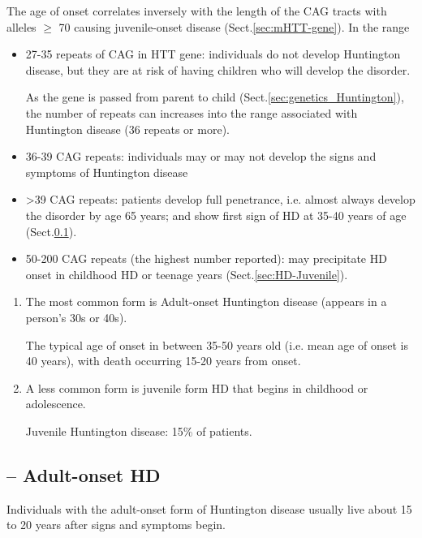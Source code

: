 The age of onset correlates inversely with the length of the CAG
tracts with alleles $\ge$ 70 causing juvenile-onset disease
(Sect.\ref{sec:mHTT-gene}).
In the range
\begin{itemize}
  
  \item 27-35 repeats of CAG in HTT gene: individuals do not develop
Huntington disease, but they are at risk of having children who will develop the
disorder. 

As the gene is passed from parent to child (Sect.\ref{sec:genetics_Huntington}),
the number of repeats can increases into the range associated with Huntington
disease (36 repeats or more).

  \item 36-39 CAG repeats: individuals may or may not develop the signs and
  symptoms of Huntington disease

  \item >39 CAG repeats: patients develop full penetrance, i.e. almost
  always develop the disorder by age 65 years; and show first sign of HD at
  35-40 years of age (Sect.\ref{sec:HD-adult}).
  
  \item 50-200 CAG repeats (the highest number reported): may precipitate HD
  onset in childhood HD or teenage years (Sect.\ref{sec:HD-Juvenile}).
\end{itemize}   


\begin{enumerate}
  \item  The most common form is Adult-onset Huntington disease (appears in a
  person's 30s or 40s). 

The typical age of onset in between 35-50 years old (i.e. mean age of onset is
40 years), with death occurring 15-20 years from onset.
  
  \item A less common form is juvenile form HD that begins in childhood or
  adolescence. 
  
Juvenile Huntington disease: 15\% of patients.
\end{enumerate}

\subsection{-- Adult-onset HD}
\label{sec:HD-adult}

Individuals with the adult-onset form of Huntington disease usually live about
15 to 20 years after signs and symptoms begin. 

